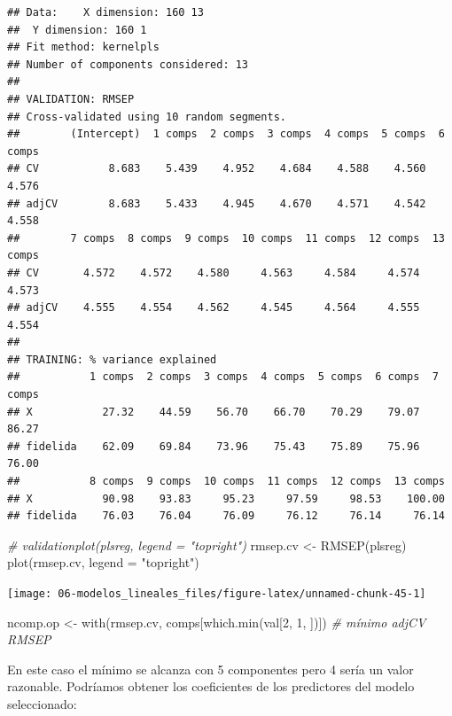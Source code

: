 \documentclass[
]{book}
\newenvironment{Shaded}{\begin{snugshade}}{\end{snugshade}}
\newcommand{\AttributeTok}[1]{\textcolor[rgb]{0.77,0.63,0.00}{#1}}
\newcommand{\CommentTok}[1]{\textcolor[rgb]{0.56,0.35,0.01}{\textit{#1}}}
\newcommand{\DecValTok}[1]{\textcolor[rgb]{0.00,0.00,0.81}{#1}}
\newcommand{\FunctionTok}[1]{\textcolor[rgb]{0.00,0.00,0.00}{#1}}
\newcommand{\NormalTok}[1]{#1}
\newcommand{\OtherTok}[1]{\textcolor[rgb]{0.56,0.35,0.01}{#1}}
\newcommand{\StringTok}[1]{\textcolor[rgb]{0.31,0.60,0.02}{#1}}
\theoremstyle{break}
\theoremstyle{definition}
\theoremstyle{definition}
\theoremstyle{definition}
\theoremstyle{definition}
\theoremstyle{remark}
\begin{document}
\begin{verbatim}
## Data:    X dimension: 160 13 
##  Y dimension: 160 1
## Fit method: kernelpls
## Number of components considered: 13
## 
## VALIDATION: RMSEP
## Cross-validated using 10 random segments.
##        (Intercept)  1 comps  2 comps  3 comps  4 comps  5 comps  6 comps
## CV           8.683    5.439    4.952    4.684    4.588    4.560    4.576
## adjCV        8.683    5.433    4.945    4.670    4.571    4.542    4.558
##        7 comps  8 comps  9 comps  10 comps  11 comps  12 comps  13 comps
## CV       4.572    4.572    4.580     4.563     4.584     4.574     4.573
## adjCV    4.555    4.554    4.562     4.545     4.564     4.555     4.554
## 
## TRAINING: % variance explained
##           1 comps  2 comps  3 comps  4 comps  5 comps  6 comps  7 comps
## X           27.32    44.59    56.70    66.70    70.29    79.07    86.27
## fidelida    62.09    69.84    73.96    75.43    75.89    75.96    76.00
##           8 comps  9 comps  10 comps  11 comps  12 comps  13 comps
## X           90.98    93.83     95.23     97.59     98.53    100.00
## fidelida    76.03    76.04     76.09     76.12     76.14     76.14
\end{verbatim}

\begin{Shaded}
\begin{Highlighting}[]
\CommentTok{\# validationplot(plsreg, legend = "topright")}
\NormalTok{rmsep.cv }\OtherTok{\textless{}{-}} \FunctionTok{RMSEP}\NormalTok{(plsreg)}
\FunctionTok{plot}\NormalTok{(rmsep.cv, }\AttributeTok{legend =} \StringTok{"topright"}\NormalTok{)}
\end{Highlighting}
\end{Shaded}

\begin{center}\texttt{[image: 06-modelos\_lineales\_files/figure-latex/unnamed-chunk-45-1]} \end{center}

\begin{Shaded}
\begin{Highlighting}[]
\NormalTok{ncomp.op }\OtherTok{\textless{}{-}} \FunctionTok{with}\NormalTok{(rmsep.cv, comps[}\FunctionTok{which.min}\NormalTok{(val[}\DecValTok{2}\NormalTok{, }\DecValTok{1}\NormalTok{, ])]) }\CommentTok{\# mínimo adjCV RMSEP}
\end{Highlighting}
\end{Shaded}

En este caso el mínimo se alcanza con 5 componentes pero 4 sería un valor razonable.
Podríamos obtener los coeficientes de los predictores del modelo seleccionado:
\end{document}
